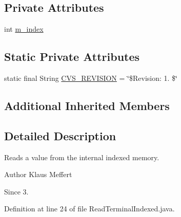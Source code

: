 \subsection*{Private Attributes}
\begin{DoxyCompactItemize}
\item 
int \hyperlink{classorg_1_1jgap_1_1gp_1_1function_1_1_read_terminal_indexed_aa3be1b7c8165c055b52e7a999e5296b2}{m\-\_\-index}
\end{DoxyCompactItemize}
\subsection*{Static Private Attributes}
\begin{DoxyCompactItemize}
\item 
static final String \hyperlink{classorg_1_1jgap_1_1gp_1_1function_1_1_read_terminal_indexed_a359b2265fb4b84a7a5dc0c71932575ba}{C\-V\-S\-\_\-\-R\-E\-V\-I\-S\-I\-O\-N} = \char`\"{}\$Revision\-: 1. \$\char`\"{}
\end{DoxyCompactItemize}
\subsection*{Additional Inherited Members}


\subsection{Detailed Description}
Reads a value from the internal indexed memory.

\begin{DoxyAuthor}{Author}
Klaus Meffert 
\end{DoxyAuthor}
\begin{DoxySince}{Since}
3. 
\end{DoxySince}


Definition at line 24 of file Read\-Terminal\-Indexed.\-java.




